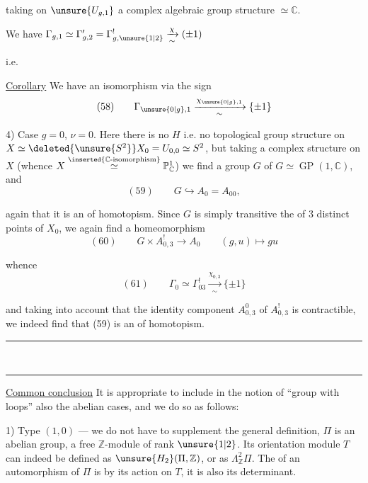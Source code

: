 
taking on $\unsure{U_{g,1}}$ a complex algebraic group structure $\simeq\mathbb{C}$.

We have  $\Gamma_{g,1}\simeq\Gamma'_{g,2}=\Gamma^!_{g,\unsure{1|2}}\xrightarrow[\sim]{\chi}(\pm1)$

i.e.

\uline{Corollary} We have an isomorphism via the sign
\[
(58)\qquad\Gamma_{\unsure{0|g},1}\xrightarrow[\sim]{\chi_{\unsure{0|g},1}}\{\pm1\}
\]

4) Case $g=0$, $\nu=0$. Here there is no $H$ i.e. no topological group structure on $X\simeq\deleted{\unsure{S^2}}X_0=U_{0,0}\simeq S^2$, but taking a complex structure on $X$ (whence $X\overset{\inserted{\mathbb{C}\text{-isomorphism}}}{\simeq}\mathbb{P}^1_{\mathbb{C}}$) we find a group $G$ of   $G\simeq\operatorname{GP}(1,\mathbb{C})$, and
\[
(59)\qquad G\hookrightarrow A_0=A_{00},
\]

 again that it is an  of homotopism. Since $G$ is simply transitive  the   of $3$ distinct points of $X_0$, we again find a homeomorphism
\[
(60)\qquad G\times A^!_{0,3}\longrightarrow A_0\qquad(g,u)\longmapsto gu
\]

whence
\[
(61)\qquad\Gamma_0\simeq\Gamma^!_{03}\xrightarrow[\sim]{\chi_{0,3}}\{\pm1\}
\]

and taking into account that the identity component $A^0_{0,3}$ of $A^!_{0,3}$ is contractible, we indeed find  that (59) is an  of homotopism.
\begin{center}\rule{1.2cm}{0.25pt}\\[-0.8em]\rule{1.2cm}{0.25pt}\end{center}

\uline{Common conclusion}  It is appropriate to include in the notion of ``group with loops'' also the  abelian cases, and we do so as follows:

1) Type $(1,0)$ --- we do not have to supplement the general definition,  $\Pi$ is an abelian group, a free $\mathbb{Z}$-module of rank $\unsure{1|2}$. Its orientation module $T$ can indeed be defined as $\unsure{H_2}(\Pi,\mathbb{Z})$, or as $\Lambda^2_{\mathbb{Z}}\Pi$. The   of an automorphism of $\Pi$ is  by its action on $T$, it is also its determinant.

